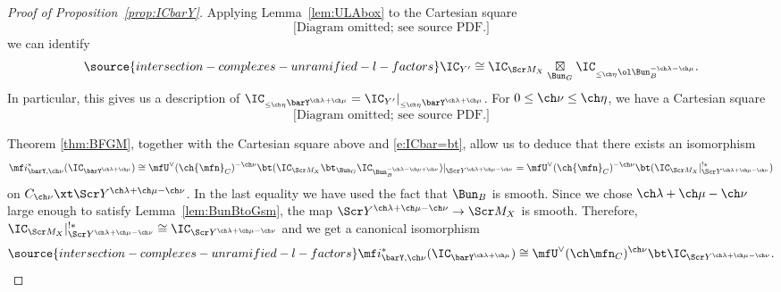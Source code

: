 \begin{proof}[Proof of Proposition~\ref{prop:ICbarY}]

Applying Lemma~\ref{lem:ULAbox} to the Cartesian square
\[
\text{[Diagram omitted; see source PDF.]}
\]
we can identify
\begin{equation} \label{e:ICbar=bt}
\source{intersection-complexes-unramified-l-factors}
    \IC_{Y'} \cong \IC_{\Scr M_X} \underset{\Bun_G}\boxtimes
\IC_{_{\le\ch\eta} \ol\Bun^{-\ch\lambda-\ch\mu}_B}.
\end{equation}
In particular, this gives us a description of $\IC_{_{\le\ch\eta}\barY^{\ch\lambda+\ch\mu}} = \IC_{Y'}|_{_{\le\ch\eta}\barY^{\ch\lambda+\ch\mu}}$.
For $0 \le \ch\nu \le \ch\eta$, we have a Cartesian square
\[
\text{[Diagram omitted; see source PDF.]}
\]

Theorem \ref{thm:BFGM}, together with the Cartesian square above and
\eqref{e:ICbar=bt}, allow us to deduce that there exists an isomorphism
\[ \mf i_{\barY,\ch\nu}^*( \IC_{\barY^{\ch\lambda+\ch\mu}} )
\cong \mfU^\vee(\ch{\mfn}_C)^{-\ch\nu} \bt (\IC_{\Scr M_X} \bt_{\Bun_G} \IC_{\Bun_B^{-\ch\lambda-\ch\mu+\ch\nu}})|_{\Scr Y^{\ch\lambda+\ch\mu-\ch\nu}}
= \mfU^\vee(\ch{\mfn}_C)^{-\ch\nu} \bt (\IC_{\Scr M_X}|^{!*}_{\Scr Y^{\ch\lambda+\ch\mu-\ch\nu}}) \]
on $C_{\ch\nu} \xt \Scr Y^{\ch\lambda+\ch\mu-\ch\nu}$.
In the last equality we have used the fact that $\Bun_B$ is smooth.
Since we chose $\ch\lambda+\ch\mu-\ch\nu$ large enough to satisfy
Lemma~\ref{lem:BunBtoGsm}, the map $\Scr Y^{\ch\lambda+\ch\mu-\ch\nu} \to \Scr M_X$ is smooth. Therefore, $\IC_{\Scr M_X}|^{!*}_{\Scr Y^{\ch\lambda+\ch\mu-\ch\nu}} \cong \IC_{\Scr Y^{\ch\lambda+\ch\mu-\ch\nu}}$ and
we get a canonical isomorphism
\begin{equation} \label{e:ICbarYrestrict}
\source{intersection-complexes-unramified-l-factors}
    \mf i_{\barY,\ch\nu}^*(\IC_{\barY^{\ch\lambda+\ch\mu}})
    \cong \mfU^\vee(\ch\mfn_C)^{\ch\nu} \bt \IC_{\Scr Y^{\ch\lambda+\ch\mu-\ch\nu}}.
\end{equation}


\end{proof}
